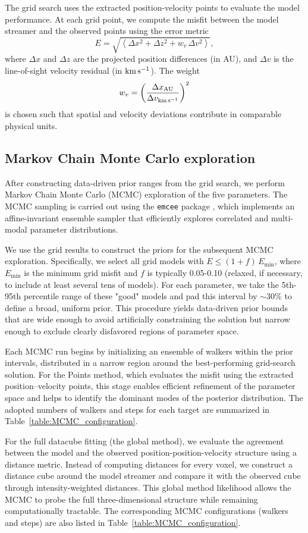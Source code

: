 The grid search uses the extracted position-velocity points to evaluate the model performance. At each grid point, we compute the misfit between the model streamer and the observed points using the error metric
\[
E = \sqrt{\left\langle \Delta x^2 + \Delta z^2 + w_v\,\Delta v^2 \right\rangle},
\]
where $\Delta x$ and $\Delta z$ are the projected position differences (in AU), and $\Delta v$ is the line-of-sight velocity residual (in $\rm km\,s^{-1}$). 
The weight
\[
w_v = \left(\frac{\Delta x_{\rm AU}}{\Delta v_{\rm km\,s^{-1}}}\right)^2
\]
is chosen such that spatial and velocity deviations contribute in comparable physical units.

\subsection{Markov Chain Monte Carlo exploration}
After constructing data-driven prior ranges from the grid search, we perform Markov Chain Monte Carlo (MCMC) exploration of the five parameters. The MCMC sampling is carried out using the \texttt{emcee} package \citep{Daniel_2013}, which implements an affine-invariant ensemble sampler that efficiently explores correlated and multi-modal parameter distributions.

We use the grid results to construct the priors for the subsequent MCMC exploration. Specifically, we select all grid models with $E \le (1 + f)\,E_{\min}$, where $E_{\min}$ is the minimum grid misfit and $f$ is typically 0.05-0.10 (relaxed, if necessary, to include at least several tens of models). For each parameter, we take the 5th-95th percentile range of these "good" models and pad this interval by $\sim30\%$ to define a broad, uniform prior. This procedure yields data-driven prior bounds that are wide enough to avoid artificially constraining the solution but narrow enough to exclude clearly disfavored regions of parameter space.

Each MCMC run begins by initializing an ensemble of walkers within the prior intervals, distributed in a narrow region around the best-performing grid-search solution. For the Points method, which evaluates the misfit using the extracted position--velocity points, this stage enables efficient refinement of the parameter space and helps to identify the dominant modes of the posterior distribution. The adopted numbers of walkers and steps for each target are summarized in Table~\ref{table:MCMC_configuration}.

For the full datacube fitting (the global method), we evaluate the agreement between the model and the observed position-position-velocity structure using a distance metric. Instead of computing distances for every voxel, we construct a distance cube around the model streamer and compare it with the observed cube through intensity-weighted distances. This global method likelihood allows the MCMC to probe the full three-dimensional structure while remaining computationally tractable. The corresponding MCMC configurations (walkers and steps) are also listed in Table~\ref{table:MCMC_configuration}.


